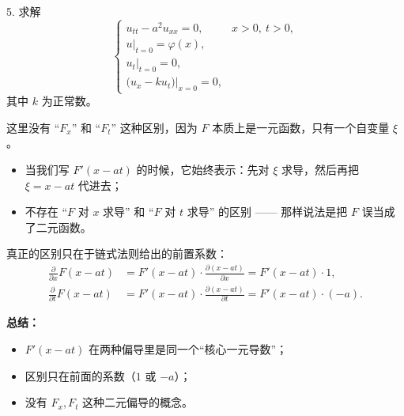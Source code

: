\begin{exercise}

5. 求解
\[
\begin{cases}
u_{tt} - a^2 u_{xx} = 0, & x>0,\ t>0, \\[6pt]
u|_{t=0} = \varphi(x), \\[6pt]
u_t|_{t=0} = 0, \\[6pt]
\big(u_x - ku_t\big)\big|_{x=0} = 0,
\end{cases}
\]
其中 $k$ 为正常数。
\end{exercise}
\begin{dxtips}
这里没有 ``$F_x$'' 和 ``$F_t$'' 这种区别，因为 $F$ 本质上是一元函数，只有一个自变量 $\xi$。

\begin{itemize}
  \item 当我们写 $F'(x-at)$ 的时候，它始终表示：先对 $\xi$ 求导，然后再把 $\xi = x-at$ 代进去；
  \item 不存在 ``$F$ 对 $x$ 求导'' 和 ``$F$ 对 $t$ 求导'' 的区别 —— 那样说法是把 $F$ 误当成了二元函数。
\end{itemize}

真正的区别只在于链式法则给出的前置系数：
\[
\begin{aligned}
\frac{\partial}{\partial x} F(x-at) &= F'(x-at)\cdot \frac{\partial (x-at)}{\partial x} = F'(x-at)\cdot 1, \\[6pt]
\frac{\partial}{\partial t} F(x-at) &= F'(x-at)\cdot \frac{\partial (x-at)}{\partial t} = F'(x-at)\cdot (-a).
\end{aligned}
\]

\medskip
\textbf{总结：}
\begin{itemize}
  \item $F'(x-at)$ 在两种偏导里是同一个“核心一元导数”；
  \item 区别只在前面的系数（$1$ 或 $-a$）；
  \item 没有 $F_x, F_t$ 这种二元偏导的概念。
\end{itemize}
\end{dxtips}
